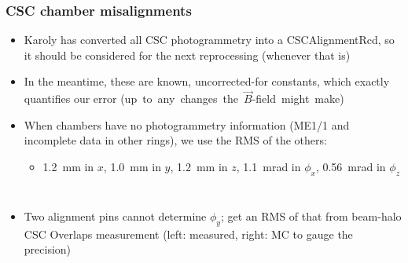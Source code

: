 \documentclass[compress]{beamer}
\begin{document}
\begin{frame}
\frametitle{CSC chamber misalignments}
\begin{itemize}
\item Karoly has converted all CSC photogrammetry into a
  CSCAlignmentRcd, so it should be considered for the next
  reprocessing (whenever that is)
\item In the meantime, these are known, uncorrected-for constants, which
  exactly quantifies our error \mbox{(up to any changes the $\vec{B}$-field might make)\hspace{-1 cm}}
\item When chambers have no photogrammetry information (ME1/1 and
  incomplete data in other rings), we use the RMS of the others:
\begin{itemize}
\item 1.2~mm in $x$, 1.0~mm in $y$, 1.2~mm in $z$, 1.1~mrad in $\phi_x$, 0.56~mrad in $\phi_z$
\end{itemize}
\end{itemize}

\begin{columns}
\begin{itemize}
\item Two alignment pins cannot determine $\phi_y$; get an RMS of that from
  beam-halo CSC Overlaps measurement (left: measured, right: MC to gauge the precision)
\end{itemize}


\end{columns}
\end{frame}
\end{document}
